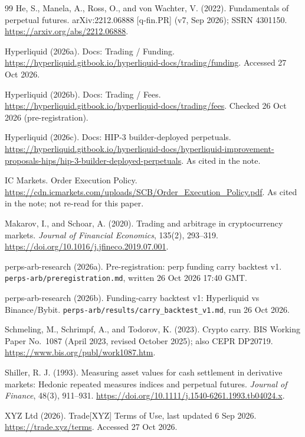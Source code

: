 \documentclass[11pt,a4paper]{article}
\begin{document}
\begin{thebibliography}{99}
He, S., Manela, A., Ross, O., and von Wachter, V. (2022). Fundamentals of perpetual futures. arXiv:2212.06888 [q-fin.PR] (v7, Sep 2026); SSRN 4301150. \url{https://arxiv.org/abs/2212.06888}.

Hyperliquid (2026a). Docs: Trading / Funding. \url{https://hyperliquid.gitbook.io/hyperliquid-docs/trading/funding}. Accessed 27 Oct 2026.

Hyperliquid (2026b). Docs: Trading / Fees. \url{https://hyperliquid.gitbook.io/hyperliquid-docs/trading/fees}. Checked 26 Oct 2026 (pre-registration).

Hyperliquid (2026c). Docs: HIP-3 builder-deployed perpetuals. \url{https://hyperliquid.gitbook.io/hyperliquid-docs/hyperliquid-improvement-proposals-hips/hip-3-builder-deployed-perpetuals}. As cited in the note.

IC Markets. Order Execution Policy. \url{https://cdn.icmarkets.com/uploads/SCB/Order_Execution_Policy.pdf}. As cited in the note; not re-read for this paper.

Makarov, I., and Schoar, A. (2020). Trading and arbitrage in cryptocurrency markets. \emph{Journal of Financial Economics}, 135(2), 293--319. \url{https://doi.org/10.1016/j.jfineco.2019.07.001}.

perps-arb-research (2026a). Pre-registration: perp funding carry backtest v1. \texttt{perps-arb/preregistration.md}, written 26 Oct 2026 17:40 GMT.

perps-arb-research (2026b). Funding-carry backtest v1: Hyperliquid vs Binance/Bybit. \texttt{perps-arb/results/carry\_backtest\_v1.md}, run 26 Oct 2026.

Schmeling, M., Schrimpf, A., and Todorov, K. (2023). Crypto carry. BIS Working Paper No.~1087 (April 2023, revised October 2025); also CEPR DP20719. \url{https://www.bis.org/publ/work1087.htm}.

Shiller, R. J. (1993). Measuring asset values for cash settlement in derivative markets: Hedonic repeated measures indices and perpetual futures. \emph{Journal of Finance}, 48(3), 911--931. \url{https://doi.org/10.1111/j.1540-6261.1993.tb04024.x}.

XYZ Ltd (2026). Trade[XYZ] Terms of Use, last updated 6 Sep 2026. \url{https://trade.xyz/terms}. Accessed 27 Oct 2026.

\end{thebibliography}
\end{document}
